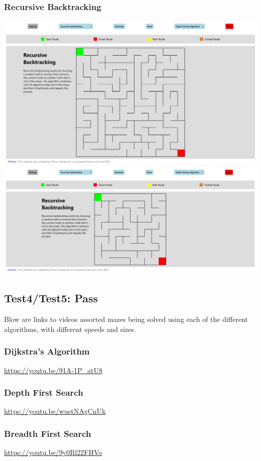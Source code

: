 \documentclass[titlepage]{article}
\begin{document}
\subsubsection{Recursive Backtracking}
\includegraphics[width=\linewidth]{assets/testing/test3c.jpg}
\includegraphics[width=\linewidth]{assets/testing/test3d.jpg}

\subsection{Test4/Test5: Pass}
Blow are links to videos assorted mazes being solved using each of the different algorithms, with different speeds and sizes.
\subsubsection{Dijkstra's Algorithm}
\url{https://youtu.be/91A-1P_atU8}
\subsubsection{Depth First Search}
\url{https://youtu.be/wustNAgCnUk}
\subsubsection{Breadth First Search}
\url{https://youtu.be/9y0Rl22FHVo}
\end{document}

